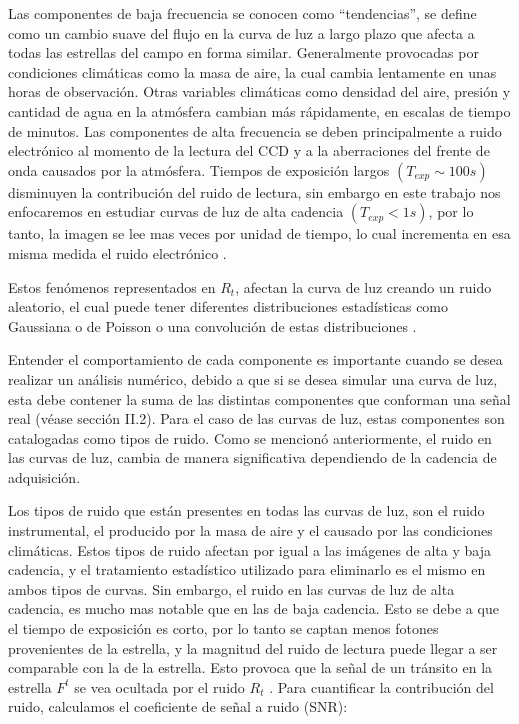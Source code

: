 Las componentes de baja frecuencia se conocen como ``tendencias'', se define como un cambio suave del flujo en la curva de luz a largo plazo que afecta a todas las estrellas del campo en forma similar. Generalmente provocadas por condiciones climáticas como la masa de aire, la cual cambia lentamente en unas horas de observación. Otras variables climáticas como densidad del aire, presión y cantidad de agua en la atmósfera cambian más rápidamente, en escalas de tiempo de minutos. Las componentes de alta frecuencia se deben principalmente a ruido electrónico al momento de la lectura del CCD y a la aberraciones del frente de onda causados por la atm\'osfera. Tiempos de exposición largos $(T_{exp} \sim 100 s)$ disminuyen la contribución del ruido de lectura, sin embargo en este trabajo nos enfocaremos en estudiar curvas de luz de alta cadencia $(T_{exp} < 1 s)$, por lo tanto, la imagen se lee mas veces por unidad de tiempo, lo cual incrementa en esa misma medida el ruido electr\'onico \cite{guerrero2020effects}.

Estos fenómenos representados en $R_{t}$, afectan la curva de luz creando un ruido aleatorio, el cual puede tener diferentes distribuciones estadísticas como Gaussiana o de Poisson o una convolución de estas distribuciones \cite{luisier2010image}.

Entender el comportamiento de cada componente es importante cuando se desea realizar un análisis numérico, debido a que si se desea simular una curva de luz, esta debe contener la suma de las distintas componentes que conforman una señal real (véase sección II.2). Para el caso de las curvas de luz, estas componentes son catalogadas como tipos de ruido. Como se mencionó anteriormente, el ruido en las curvas de luz, cambia de manera significativa dependiendo de la cadencia de adquisición.

Los tipos de ruido que están presentes en todas las curvas de luz, son el ruido instrumental, el producido por la masa de aire y el causado por las condiciones climáticas. Estos tipos de ruido afectan por igual a las imágenes de alta y baja cadencia, y el tratamiento estadístico utilizado para eliminarlo es el mismo en ambos tipos de curvas. Sin embargo, el ruido en las curvas de luz de alta cadencia, es mucho mas notable que en las de baja cadencia. Esto se debe a que el tiempo de exposición es corto, por lo tanto se captan menos fotones provenientes de la estrella, y la magnitud del ruido de lectura puede llegar a ser comparable con la de la estrella. Esto provoca que la señal de un tránsito en la estrella $F^{t}$  se vea ocultada por el ruido $R_{t}$ \cite{pont2006effect}. Para cuantificar la contribución del ruido, calculamos el coeficiente de señal a ruido (SNR):

